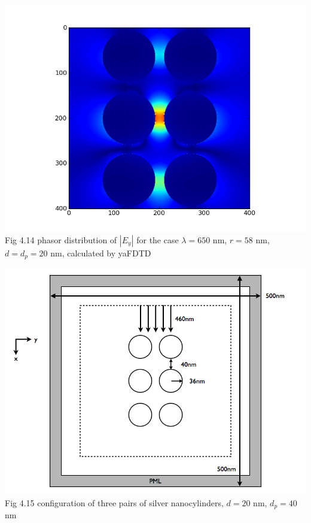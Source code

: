 \documentclass[openany]{book}
\begin{document}
\begin{center}
\includegraphics[scale=0.8]{images/ey-r58.png}\\
Fig 4.14
phasor distribution of $|E_y|$ for the case $\lambda = 650$ nm, $r = 58$ nm, $d = d_p = 20$ nm, calculated by yaFDTD
\end{center}


\begin{center}
\includegraphics[scale=0.5]{images/open-cavity-config-d40.png}\\
Fig 4.15
configuration of three pairs of silver nanocylinders, $d = 20$ nm, $d_p = 40$ nm
\end{center}
\end{document}
